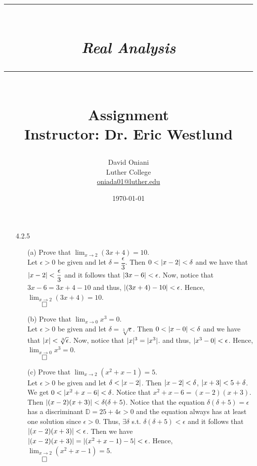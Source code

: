 \documentclass[11pt]{article}
\author{David Oniani\\
        Luther College\\
        \href{mailto:oniada01@luther.edu}{oniada01@luther.edu}}
\title{\rule{\paperwidth - 150pt}{1pt}\textbf{\\\textit{Real Analysis}\\}\rule
{\paperwidth - 150pt}{1pt}\\\textbf{Assignment \textnumero7}\\{\normalsize
Instructor: Dr. Eric Westlund}}
\date{\today}
\DeclarePairedDelimiter\abs{\lvert}{\rvert}%
\begin{document}
\maketitle

%
%
%

\begin{itemize}
    \item[]

    \item[]

    \item[4.2.5]
        \begin{itemize}
            \item[(a)]
                Prove that $\lim_{x \to 2} (3x + 4) = 10$.
                \\
                Let $\epsilon > 0$ be given and let $\delta =
                \dfrac{\epsilon}{3}$. Then $0 < \abs{x - 2} < \delta$ and we
                have that $\abs{x - 2} < \dfrac{\epsilon}{3}$ and it follows
                that $\abs{3x - 6} < \epsilon$. Now, notice that $3x - 6 = 3x +
                4 - 10$ and thus, $\abs{(3x + 4) - 10} < \epsilon$. Hence,
                $\lim_{x \to 2} (3x + 4) = 10$.\\
                $\qed$

            \item[(b)]
                Prove that $\lim_{x \to 0} x^3 = 0$.
                \\
                Let $\epsilon > 0$ be given and let $\delta =
                \sqrt[3]{\epsilon}$. Then $0 < \abs{x - 0} < \delta$ and we
                have that $\abs{x} < \sqrt[3]{\epsilon}$. Now, notice that
                $\abs{x}^3 = \abs{x^3}$.  and thus, $\abs{x^3 - 0} < \epsilon$.
                Hence, $\lim_{x \to 0} x^3 = 0$.\\
                $\qed$

            \item[(c)]
                Prove that $\lim_{x \to 2} (x^2 + x - 1) = 5$.
                \\
                Let $\epsilon > 0$ be given and let $\delta < \abs{x - 2}$.
                Then $\abs{x - 2} < \delta$, $\abs{x + 3} < 5 + \delta$. We get
                $0 < \abs{x^2 + x - 6} < \delta$. Notice that $x^2 + x - 6 = (x
                - 2)(x + 3)$. Then $\abs{(x - 2)(x + 3)} < \delta(\delta + 5)$.
                Notice that the equation $\delta(\delta + 5) = \epsilon$ has a
                discriminant $\mathbb{D} = 25 + 4\epsilon > 0$ and the equation
                always has at least one solution since $\epsilon > 0$.  Thus,
                $\exists \delta$ s.t. $\delta(\delta + 5) < \epsilon$ and it
                follows that $\abs{(x - 2)(x + 3)} < \epsilon$. Then we have
                $\abs{(x - 2)(x + 3)} = \abs{(x^2 + x - 1) - 5} < \epsilon$.
                Hence, $\lim_{x \to 2} (x^2 + x - 1) = 5$.\\
                $\qed$


\end{itemize}
\end{itemize}
\end{document}
